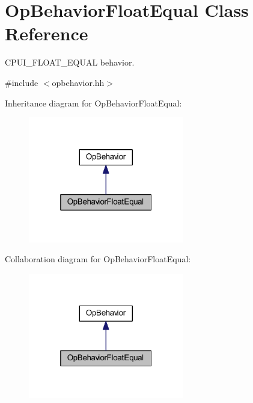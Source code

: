 \hypertarget{class_op_behavior_float_equal}{}\section{Op\+Behavior\+Float\+Equal Class Reference}
\label{class_op_behavior_float_equal}


C\+P\+U\+I\+\_\+\+F\+L\+O\+A\+T\+\_\+\+E\+Q\+U\+AL behavior.  




{\ttfamily \#include $<$opbehavior.\+hh$>$}



Inheritance diagram for Op\+Behavior\+Float\+Equal\+:
\nopagebreak
\begin{figure}[H]
\begin{center}
\leavevmode
\includegraphics[width=193pt]{class_op_behavior_float_equal__inherit__graph}
\end{center}
\end{figure}


Collaboration diagram for Op\+Behavior\+Float\+Equal\+:
\nopagebreak
\begin{figure}[H]
\begin{center}
\leavevmode
\includegraphics[width=193pt]{class_op_behavior_float_equal__coll__graph}
\end{center}
\end{figure}
